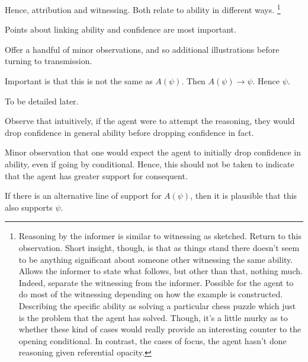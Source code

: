 \documentclass[10pt]{article}
\begin{document}
\begin{note}
  Hence, attribution and witnessing.
  Both relate to ability in different ways.\nolinebreak
  \footnote{
    Reasoning by the informer is similar to witnessing as sketched.
    Return to this observation.
    Short insight, though, is that as things stand there doesn't seem to be anything significant about someone other witnessing the same ability.
    Allows the informer to state what follows, but other than that, nothing much.
    Indeed, separate the witnessing from the informer.
    Possible for the agent to do most of the witnessing depending on how the example is constructed.
    Describing the specific ability as solving a particular chess puzzle which just is the problem that the agent has solved.
    Though, it's a little murky as to whether these kind of cases would really provide an interesting counter to the opening conditional.
    In contrast, the cases of focus, the agent hasn't done reasoning given referential opacity.
  }
\end{note}

\begin{note}
  Points about linking ability and confidence are most important.

  Offer a handful of minor observations, and so additional illustrations before turning to transmission.
\end{note}

\begin{note}
  Important is that this is not the same as \(A(\psi)\).
  Then \(A(\psi) \rightarrow \psi\).
  Hence \(\psi\).

  To be detailed later.
\end{note}

\begin{note}
  Observe that intuitively, if the agent were to attempt the reasoning, they would drop confidence in general ability before dropping confidence in fact.

  Minor observation that one would expect the agent to initially drop confidence in ability, even if going by conditional.
  Hence, this should not be taken to indicate that the agent has greater support for consequent.
\end{note}

\begin{note}
  If there is an alternative line of support for \(A(\psi)\), then it is plausible that this also supports \(\psi\).
\end{note}
\end{document}
